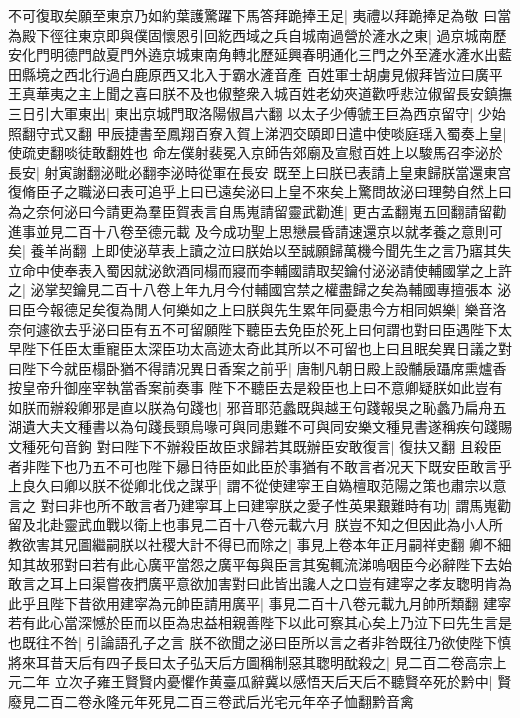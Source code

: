 不可復取矣願至東京乃如約葉護驚躍下馬答拜跪捧王足|{
	夷禮以拜跪捧足為敬}
曰當為殿下徑往東京即與僕固懷恩引回紇西域之兵自城南過營於滻水之東|{
	過京城南歷安化門明德門啟夏門外遶京城東南角轉北歷延興春明通化三門之外至滻水滻水出藍田縣境之西北行過白鹿原西又北入于霸水滻音產}
百姓軍士胡虜見俶拜皆泣曰廣平王真華夷之主上聞之喜曰朕不及也俶整衆入城百姓老幼夾道歡呼悲泣俶留長安鎮撫三日引大軍東出|{
	東出京城門取洛陽俶昌六翻}
以太子少傅虢王巨為西京留守|{
	少始照翻守式又翻}
甲辰捷書至鳳翔百寮入賀上涕泗交頤即日遣中使啖庭瑶入蜀奏上皇|{
	使疏吏翻啖徒敢翻姓也}
命左僕射裴冕入京師告郊廟及宣慰百姓上以駿馬召李泌於長安|{
	射寅謝翻泌毗必翻李泌時從軍在長安}
既至上曰朕已表請上皇東歸朕當還東宫復脩臣子之職泌曰表可追乎上曰已遠矣泌曰上皇不來矣上驚問故泌曰理勢自然上曰為之奈何泌曰今請更為羣臣賀表言自馬嵬請留靈武勸進|{
	更古孟翻嵬五回翻請留勸進事並見二百十八卷至德元載}
及今成功聖上思戀晨昏請速還京以就孝養之意則可矣|{
	養羊尚翻}
上即使泌草表上讀之泣曰朕始以至誠願歸萬機今聞先生之言乃寤其失立命中使奉表入蜀因就泌飲酒同榻而寢而李輔國請取契鑰付泌泌請使輔國掌之上許之|{
	泌掌契鑰見二百十八卷上年九月今付輔國宫禁之權盡歸之矣為輔國專擅張本}
泌曰臣今報德足矣復為閒人何樂如之上曰朕與先生累年同憂患今方相同娯樂|{
	樂音洛}
奈何遽欲去乎泌曰臣有五不可留願陛下聽臣去免臣於死上曰何謂也對曰臣遇陛下太早陛下任臣太重寵臣太深臣功太高迹太奇此其所以不可留也上曰且眠矣異日議之對曰陛下今就臣榻卧猶不得請况異日香案之前乎|{
	唐制凡朝日殿上設黼扆躡席熏爐香按皇帝升御座宰執當香案前奏事}
陛下不聽臣去是殺臣也上曰不意卿疑朕如此豈有如朕而辦殺卿邪是直以朕為句踐也|{
	邪音耶范蠡既與越王句踐報吳之恥蠡乃扁舟五湖遺大夫文種書以為句踐長頸烏喙可與同患難不可與同安樂文種見書遂稱疾句踐賜文種死句音鉤}
對曰陛下不辦殺臣故臣求歸若其既辦臣安敢復言|{
	復扶又翻}
且殺臣者非陛下也乃五不可也陛下曏日待臣如此臣於事猶有不敢言者况天下既安臣敢言乎上良久曰卿以朕不從卿北伐之謀乎|{
	謂不從使建寜王自媯檀取范陽之策也肅宗以意言之}
對曰非也所不敢言者乃建寜耳上曰建寜朕之愛子性英果艱難時有功|{
	謂馬嵬勸留及北赴靈武血戰以衛上也事見二百十八卷元載六月}
朕豈不知之但因此為小人所教欲害其兄圖繼嗣朕以社稷大計不得已而除之|{
	事見上卷本年正月嗣祥吏翻}
卿不細知其故邪對曰若有此心廣平當怨之廣平每與臣言其寃輒流涕嗚咽臣今必辭陛下去始敢言之耳上曰渠嘗夜捫廣平意欲加害對曰此皆出讒人之口豈有建寜之孝友聦明肯為此乎且陛下昔欲用建寜為元帥臣請用廣平|{
	事見二百十八卷元載九月帥所類翻}
建寜若有此心當深憾於臣而以臣為忠益相親善陛下以此可察其心矣上乃泣下曰先生言是也既往不咎|{
	引論語孔子之言}
朕不欲聞之泌曰臣所以言之者非咎既往乃欲使陛下慎將來耳昔天后有四子長曰太子弘天后方圖稱制惡其聦明酖殺之|{
	見二百二卷高宗上元二年}
立次子雍王賢賢内憂懼作黄臺瓜辭冀以感悟天后天后不聽賢卒死於黔中|{
	賢廢見二百二卷永隆元年死見二百三卷武后光宅元年卒子恤翻黔音禽}
